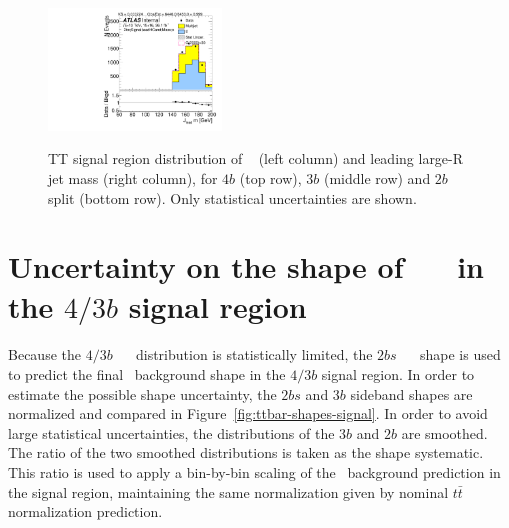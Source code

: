 \begin{figure}[htbp!]
\begin{center}
\includegraphics[width=0.41\textwidth,angle=-90]{figures/boosted/TT/Moriond_TT_TwoTag_split_Signal_leadHCand_Mass_s.pdf}\\
\end{center}
\caption{TT signal region distribution of \mtwoJ~ (left column) and leading large-R jet mass (right column), for $4b$ (top row), $3b$ (middle row) and $2b$ split (bottom row). Only statistical uncertainties are shown.}
\label{CRSB:TTSR_Distribution}
\end{figure}


\clearpage
\section{Uncertainty on the shape of \ttbar\ \mtwoJ~ in the $4/3b$ signal region}
\label{sec:unc-shape-ttbar-in-sr}

\paragraph{}
Because the $4/3b$ \ttbar\ \mtwoJ~ distribution is statistically limited, the $2bs$ \ttbar\ \mtwoJ~ shape is used to predict the final \ttbar\ background shape in the $4/3b$ signal region.
In order to estimate the possible shape uncertainty, the $2bs$ and $3b$ sideband shapes are normalized and compared in Figure~\ref{fig:ttbar-shapes-signal}.  
In order to avoid large statistical uncertainties, the distributions of the $3b$ and $2b$ are smoothed. 
The ratio of the two smoothed distributions is taken as the shape systematic. 
This ratio is used to apply a bin-by-bin scaling of the \ttbar\ background prediction in the signal region, maintaining the same normalization given by nominal $t\bar{t}$ normalization prediction.

